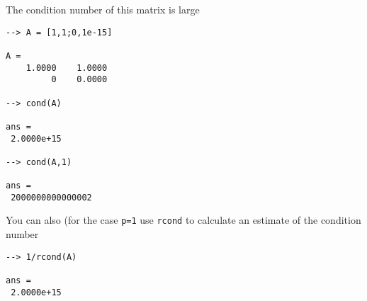 The condition number of this matrix is large
\begin{verbatim}
--> A = [1,1;0,1e-15]

A = 
    1.0000    1.0000 
         0    0.0000 

--> cond(A)

ans = 
 2.0000e+15 

--> cond(A,1)

ans = 
 2000000000000002 
\end{verbatim}
You can also (for the case \verb|p=1| use \verb|rcond| to calculate an estimate
of the condition number
\begin{verbatim}
--> 1/rcond(A)

ans = 
 2.0000e+15 
\end{verbatim}

